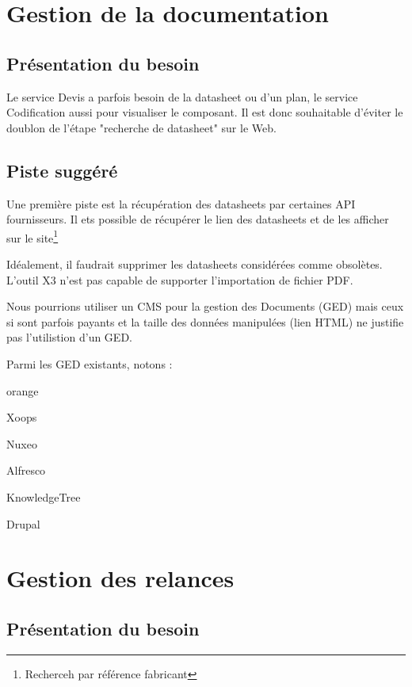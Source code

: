 {\chapter{Gestion de la documentation}
\section{Présentation du besoin}

Le service Devis a parfois besoin de la datasheet ou d’un plan, le service Codification aussi
pour visualiser le composant. Il est donc souhaitable d’éviter le doublon de l’étape "recherche de datasheet" sur le Web.


\section{Piste suggéré}

Une première piste est la récupération des datasheets par certaines API fournisseurs. Il ets possible de récupérer le lien des datasheets et de les afficher sur le site\footnote{Recherceh par référence fabricant}


Idéalement, il faudrait supprimer les datasheets considérées comme obsolètes.\\


L’outil X3 n'est pas capable de supporter l’importation de fichier PDF.

Nous pourrions utiliser un CMS pour la gestion des Documents (GED) mais ceux si sont parfois payants et la taille des données manipulées (lien HTML) ne justifie pas l'utilistion d'un GED.

Parmi les GED existants, notons : 

\begin{items}{orange}{\Bullet}
\item Xoops
\item Nuxeo
\item Alfresco
\item KnowledgeTree
\item Drupal
\end{items}
\chapter{Gestion des relances}


\section{Présentation du besoin}

}
